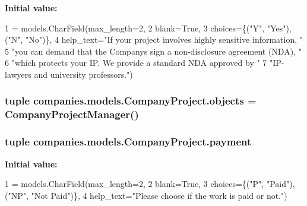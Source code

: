 {\bfseries Initial value\-:}
\begin{DoxyCode}
1 = models.CharField(max\_length=2,
2                                     blank=\textcolor{keyword}{True},
3                                     choices=\{(\textcolor{stringliteral}{"Y"}, \textcolor{stringliteral}{"Yes"}), (\textcolor{stringliteral}{"N"}, \textcolor{stringliteral}{"No"})\},
4                                     help\_text=\textcolor{stringliteral}{"If your project involves highly sensitive information, "}
5                                               \textcolor{stringliteral}{"you can demand that the Companys sign a non-disclosure
       agreement (NDA), "}
6                                               \textcolor{stringliteral}{"which protects your IP. We provide a standard NDA approved
       by "}
7                                               \textcolor{stringliteral}{"IP-lawyers and university professors."})
\end{DoxyCode}
\hypertarget{classcompanies_1_1models_1_1_company_project_a4eb2ba8278f09da3f6fbb940448dcf99}{
\subsubsection[{objects}]{\setlength{\rightskip}{0pt plus 5cm}tuple companies.\-models.\-Company\-Project.\-objects = {\bf Company\-Project\-Manager}()\hspace{0.3cm}{\ttfamily [static]}}}\label{classcompanies_1_1models_1_1_company_project_a4eb2ba8278f09da3f6fbb940448dcf99}
\hypertarget{classcompanies_1_1models_1_1_company_project_ac0132379d4efdc016a9aa0ecf31bc0d3}{
\subsubsection[{payment}]{\setlength{\rightskip}{0pt plus 5cm}tuple companies.\-models.\-Company\-Project.\-payment\hspace{0.3cm}{\ttfamily [static]}}}\label{classcompanies_1_1models_1_1_company_project_ac0132379d4efdc016a9aa0ecf31bc0d3}
{\bfseries Initial value\-:}
\begin{DoxyCode}
1 = models.CharField(max\_length=2,
2                                blank=\textcolor{keyword}{True},
3                                choices=\{(\textcolor{stringliteral}{"P"}, \textcolor{stringliteral}{"Paid"}), (\textcolor{stringliteral}{"NP"}, \textcolor{stringliteral}{"Not Paid"})\},
4                                help\_text=\textcolor{stringliteral}{"Please choose if the work is paid or not."})
\end{DoxyCode}
